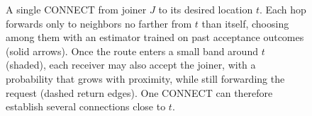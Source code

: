 \begin{figure}[t]
\caption{A single \textsf{CONNECT} from joiner $J$ to its desired
location $t$. Each hop forwards only to neighbors no farther from $t$
than itself, choosing among them with an estimator trained on past
acceptance outcomes (solid arrows). Once the route enters a small band
around $t$ (shaded), each receiver may also accept the joiner, with a
probability that grows with proximity, while still forwarding the
request (dashed return edges). One \textsf{CONNECT} can therefore
establish several connections close to $t$.}
\label{fig:connect-path}
\end{figure}
